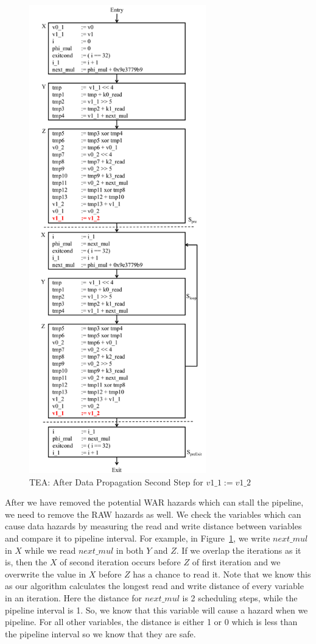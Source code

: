 \begin{figure}[H]
\begin{center}
\includegraphics[height=8in]{fig-proposal/tea-after-data-propagation4}
\caption{TEA: After Data Propagation Second Step for $v1\_1 := v1\_2$}
\label{fig:tea-after-data-propagation4}
\end{center}
\end{figure}

After we have removed the potential WAR hazards which can stall the pipeline, we need to remove the RAW hazards as well.
We check the variables which can cause data hazards by measuring the read and write distance between variables 
and compare it to pipeline interval. For example, in Figure~\ref{fig:tea-after-data-propagation4}, we write $next\_mul$ 
in $X$ while we read $next\_mul$ in both $Y$ and $Z$. 
If we overlap the iterations as it is, then the $X$ of second iteration occurs before $Z$ of first iteration and we overwrite the value in 
$X$ before $Z$ has a chance to read it. Note that we know this as our algorithm calculates the longest read and write distance of every variable 
in an iteration. Here the distance for $next\_mul$ is 2 scheduling steps, while the pipeline interval is 1. So, we know that this
variable will cause a hazard when we pipeline. For all other variables, the distance is either 1 or 0 which is less than the pipeline interval so we know that they are
safe. 

